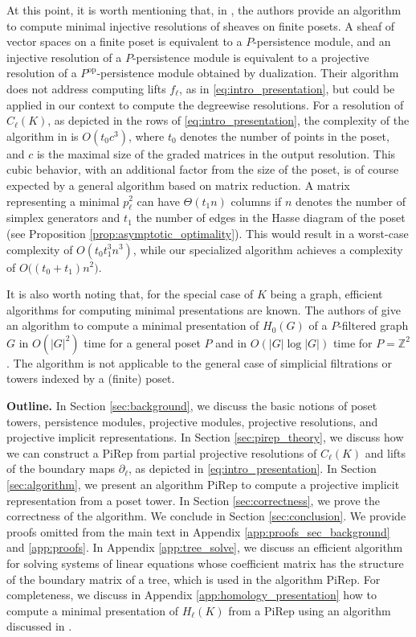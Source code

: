 \documentclass[english,a4paper,nolineno,cleveref]{socg-lipics-v2021}
\begin{document}
At this point, it is worth mentioning that, in \cite{brown2024discretemicrolocalmorsetheory}, the authors provide an algorithm to compute minimal injective resolutions of sheaves on finite posets. A sheaf of vector spaces on a finite poset is equivalent to a $P$-persistence module, and an injective resolution of a $P$-persistence module is equivalent to a projective resolution of a $P^\text{op}$-persistence module obtained by dualization. Their algorithm does not address computing lifts $f_\ell$, as in \eqref{eq:intro_presentation}, but could be applied in our context to compute the degreewise resolutions. For a resolution of $C_\ell(K)$, as depicted in the rows of \eqref{eq:intro_presentation}, the complexity of the algorithm in \cite{brown2024discretemicrolocalmorsetheory} is $O(t_0c^3)$, where $t_0$ denotes the number of points in the poset, and $c$ is the maximal size of the graded matrices in the output resolution. This cubic behavior, with an additional factor from the size of the poset, is of course expected by a general algorithm based on matrix reduction. A matrix representing a minimal $p_\ell^2$ can have $\Theta(t_1n)$ columns if $n$ denotes the number of simplex generators and $t_1$ the number of edges in the Hasse diagram of the poset (see Proposition \ref{prop:asymptotic_optimality}). This would result in a worst-case complexity of $O(t_0t_1^3n^3)$, while our specialized algorithm achieves a complexity of $O\big((t_0+t_1)n^2\big)$. 

It is also worth noting that, for the special case of $K$ being a graph, efficient algorithms for computing minimal presentations are known. The authors of \cite{morozov2024computingbettitablesminimal} give an algorithm to compute a minimal presentation of $H_0(G)$ of a $P$-filtered graph $G$ in $O(|G|^2)$ time for a general poset $P$ and in $O(|G| \log |G|)$ time for $P=\mathbb{Z}^2$.
The algorithm is not applicable to the general case of simplicial filtrations or towers indexed by a (finite) poset.

\textbf{Outline.} In Section \ref{sec:background}, we discuss the basic notions of poset towers, persistence modules, projective modules, projective resolutions, and projective implicit representations. In Section \ref{sec:pirep_theory}, we discuss how we can construct a PiRep from partial projective resolutions of $C_\ell(K)$ and lifts of the boundary maps $\partial_\ell$, as depicted in \eqref{eq:intro_presentation}. In Section \ref{sec:algorithm}, we present an algorithm {\sc PiRep} to compute a projective implicit representation from a poset tower. In Section \ref{sec:correctness}, we prove the correctness of the algorithm. We conclude in Section \ref{sec:conclusion}. We provide proofs omitted from the main text in Appendix \ref{app:proofs_sec_background} and \ref{app:proofs}. In Appendix \ref{app:tree_solve}, we discuss an efficient algorithm for solving systems of linear equations whose coefficient matrix has the structure of the boundary matrix of a tree, which is used in the algorithm {\sc PiRep}. For completeness, we discuss in Appendix \ref{app:homology_presentation} how to compute a minimal presentation of $H_\ell(K)$ from a PiRep using an algorithm discussed in \cite{brown2024discretemicrolocalmorsetheory}. 
\end{document}
